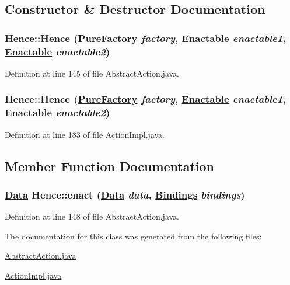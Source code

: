 \subsection{Constructor \& Destructor Documentation}
\hypertarget{classHence_a0}{
\subsubsection[Hence]{\setlength{\rightskip}{0pt plus 5cm}Hence::Hence (\hyperlink{classPureFactory}{Pure\-Factory} {\em factory}, \hyperlink{interfaceEnactable}{Enactable} {\em enactable1}, \hyperlink{interfaceEnactable}{Enactable} {\em enactable2})}}
\label{classHence_a0}




Definition at line 145 of file Abstract\-Action.java.\hypertarget{classHence_a2}{
\subsubsection[Hence]{\setlength{\rightskip}{0pt plus 5cm}Hence::Hence (\hyperlink{classPureFactory}{Pure\-Factory} {\em factory}, \hyperlink{interfaceEnactable}{Enactable} {\em enactable1}, \hyperlink{interfaceEnactable}{Enactable} {\em enactable2})}}
\label{classHence_a2}




Definition at line 183 of file Action\-Impl.java.

\subsection{Member Function Documentation}
\hypertarget{classHence_a1}{
\subsubsection[enact]{\setlength{\rightskip}{0pt plus 5cm}\hyperlink{interfaceData}{Data} Hence::enact (\hyperlink{interfaceData}{Data} {\em data}, \hyperlink{interfaceBindings}{Bindings} {\em bindings})}}
\label{classHence_a1}




Definition at line 148 of file Abstract\-Action.java.

The documentation for this class was generated from the following files:\begin{CompactItemize}
\item 
\hyperlink{AbstractAction_8java-source}{Abstract\-Action.java}\item 
\hyperlink{ActionImpl_8java-source}{Action\-Impl.java}\end{CompactItemize}
